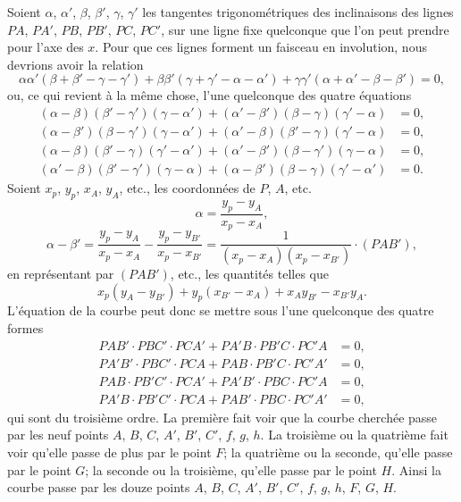 \documentclass[12pt,a4paper]{article}
\begin{document}
Soient $\alpha$, $\alpha'$, $\beta$, $\beta'$, $\gamma$, $\gamma'$ les tangentes trigonom\'etriques des inclinaisons des lignes $PA$, $PA'$, $PB$, $PB'$, $PC$, $PC'$, sur une ligne fixe quelconque que l'on peut prendre pour l'axe des $x$. Pour que ces lignes forment un faisceau en involution, nous devrions avoir la relation
\[
\alpha\alpha'(\beta + \beta' - \gamma - \gamma') + \beta\beta'(\gamma + \gamma' - \alpha - \alpha') + \gamma\gamma'(\alpha + \alpha' - \beta - \beta') = 0,
\]
ou, ce qui revient \`a la m\^eme chose, l'une quelconque des quatre \'equations
\begin{align*}
(\alpha - \beta)(\beta' - \gamma')(\gamma - \alpha') + (\alpha' - \beta')(\beta - \gamma)(\gamma' - \alpha) &= 0,\\
(\alpha - \beta')(\beta - \gamma')(\gamma - \alpha') + (\alpha' - \beta)(\beta' - \gamma)(\gamma' - \alpha) &= 0,\\
(\alpha - \beta)(\beta' - \gamma)(\gamma' - \alpha') + (\alpha' - \beta')(\beta - \gamma')(\gamma - \alpha) &= 0,\\
(\alpha' - \beta)(\beta' - \gamma')(\gamma - \alpha) + (\alpha - \beta')(\beta - \gamma)(\gamma' - \alpha') &= 0.
\end{align*}
Soient $x_p$, $y_p$, $x_A$, $y_A$, etc., les coordonn\'ees de $P$, $A$, etc.
\[
\alpha = \frac{y_p - y_A}{x_p - x_A},
\]
\[
\alpha - \beta' = \frac{y_p - y_A}{x_p - x_A} - \frac{y_p - y_{B'}}{x_p - x_{B'}} = \frac{1}{(x_p - x_A)(x_p - x_{B'})}\cdot(PAB'),
\]
en repr\'esentant par $(PAB')$, etc., les quantit\'es telles que
\[
x_p(y_A - y_{B'}) + y_p(x_{B'} - x_A) + x_A y_{B'} - x_{B'} y_A.
\]
L'\'equation de la courbe peut donc se mettre sous l'une quelconque des quatre formes
\begin{align*}
PAB' \cdot PBC' \cdot PCA' + PA'B \cdot PB'C \cdot PC'A &= 0,\\
PA'B' \cdot PBC' \cdot PCA + PAB \cdot PB'C \cdot PC'A' &= 0,\\
PAB \cdot PB'C' \cdot PCA' + PA'B' \cdot PBC \cdot PC'A &= 0,\\
PA'B \cdot PB'C' \cdot PCA + PAB' \cdot PBC \cdot PC'A' &= 0,
\end{align*}
qui sont du troisi\`eme ordre. La premi\`ere fait voir que la courbe cherch\'ee passe par les neuf points $A$, $B$, $C$, $A'$, $B'$, $C'$, $f$, $g$, $h$. La troisi\`eme ou la quatri\`eme fait voir qu'elle passe de plus par le point $F$; la quatri\`eme ou la seconde, qu'elle passe par le point $G$; la seconde ou la troisi\`eme, qu'elle passe par le point $H$. Ainsi la courbe passe par les douze points $A$, $B$, $C$, $A'$, $B'$, $C'$, $f$, $g$, $h$, $F$, $G$, $H$.
\end{document}
